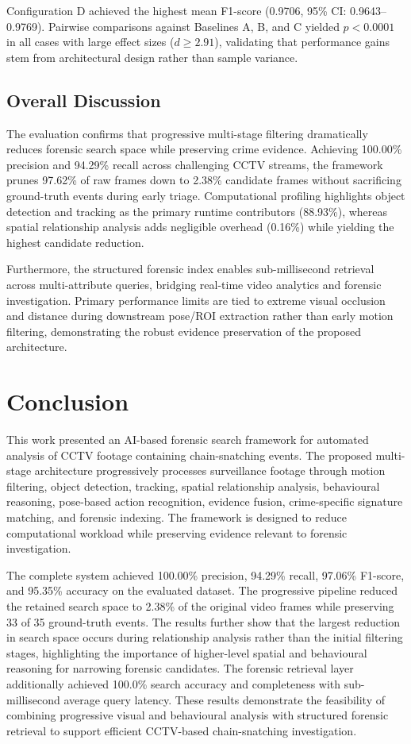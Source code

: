 \documentclass[runningheads]{llncs}
\begin{document}
Configuration D achieved the highest mean F1-score (0.9706, 95\% CI: 0.9643--0.9769). Pairwise comparisons against Baselines A, B, and C yielded $p < 0.0001$ in all cases with large effect sizes ($d \ge 2.91$), validating that performance gains stem from architectural design rather than sample variance.

\subsection{Overall Discussion}

The evaluation confirms that progressive multi-stage filtering dramatically reduces forensic search space while preserving crime evidence. Achieving 100.00\% precision and 94.29\% recall across challenging CCTV streams, the framework prunes 97.62\% of raw frames down to 2.38\% candidate frames without sacrificing ground-truth events during early triage. Computational profiling highlights object detection and tracking as the primary runtime contributors (88.93\%), whereas spatial relationship analysis adds negligible overhead (0.16\%) while yielding the highest candidate reduction.

Furthermore, the structured forensic index enables sub-millisecond retrieval across multi-attribute queries, bridging real-time video analytics and forensic investigation. Primary performance limits are tied to extreme visual occlusion and distance during downstream pose/ROI extraction rather than early motion filtering, demonstrating the robust evidence preservation of the proposed architecture.

\section{Conclusion}
This work presented an AI-based forensic search framework for automated
analysis of CCTV footage containing chain-snatching events. The proposed
multi-stage architecture progressively processes surveillance footage
through motion filtering, object detection, tracking, spatial
relationship analysis, behavioural reasoning, pose-based action
recognition, evidence fusion, crime-specific signature matching, and
forensic indexing. The framework is designed to reduce computational
workload while preserving evidence relevant to forensic investigation.

The complete system achieved 100.00\% precision, 94.29\% recall,
97.06\% F1-score, and 95.35\% accuracy on the evaluated dataset. The
progressive pipeline reduced the retained search space to 2.38\% of the
original video frames while preserving 33 of 35 ground-truth events.
The results further show that the largest reduction in search space
occurs during relationship analysis rather than the initial filtering
stages, highlighting the importance of higher-level spatial and
behavioural reasoning for narrowing forensic candidates. The forensic
retrieval layer additionally achieved 100.0\% search accuracy and
completeness with sub-millisecond average query latency. These results
demonstrate the feasibility of combining progressive visual and
behavioural analysis with structured forensic retrieval to support
efficient CCTV-based chain-snatching investigation.



\end{document}

